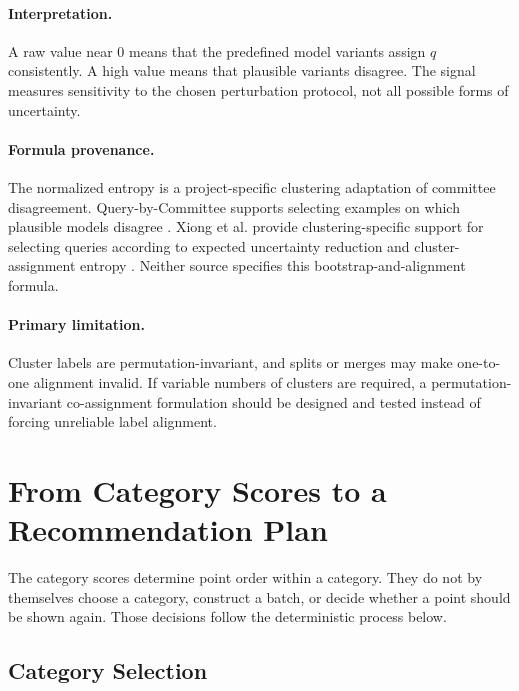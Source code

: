 \documentclass[11pt]{article}
\begin{document}
\paragraph{Interpretation.}
A raw value near $0$ means that the predefined model variants assign $q$
consistently. A high value means that plausible variants disagree. The signal
measures sensitivity to the chosen perturbation protocol, not all possible
forms of uncertainty.

\paragraph{Formula provenance.}
The normalized entropy is a project-specific clustering adaptation of
committee disagreement. Query-by-Committee supports selecting examples on
which plausible models disagree \cite{seung1992qbc}. Xiong et al. provide
clustering-specific support for selecting queries according to expected
uncertainty reduction and cluster-assignment entropy \cite{xiong2017active}.
Neither source specifies this bootstrap-and-alignment formula.

\paragraph{Primary limitation.}
Cluster labels are permutation-invariant, and splits or merges may make
one-to-one alignment invalid. If variable numbers of clusters are required, a
permutation-invariant co-assignment formulation should be designed and tested
instead of forcing unreliable label alignment.

\section{From Category Scores to a Recommendation Plan}

The category scores determine point order within a category. They do not by
themselves choose a category, construct a batch, or decide whether a point
should be shown again. Those decisions follow the deterministic process below.

\subsection{Category Selection}
\end{document}
